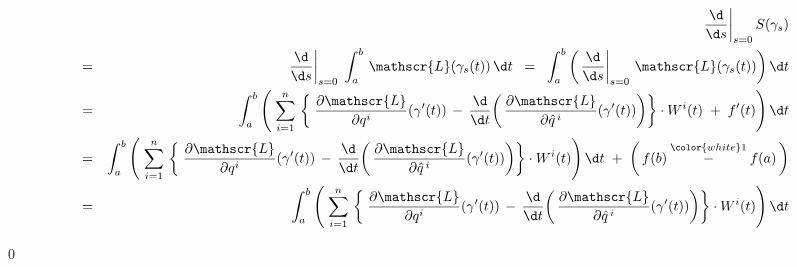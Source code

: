 \vskip 0.5cm
\begin{eqnarray*}
&&
	\left.\dfrac{\d}{\d s}\right\vert_{s=0} S\!\left(\gamma_{s}\right)
\\
& = &
	\left.\dfrac{\d}{\d s}\right\vert_{s=0}\; \int_{a}^{b}\,\mathscr{L}\!\left(\gamma_{s}(t)\right)\d t
\;\; = \;\;
	\int_{a}^{b}\left(\left.\dfrac{\d}{\d s}\right\vert_{s=0}\,\mathscr{L}\!\left(\gamma_{s}(t)\right)\right)\d t
\\
& = &
	\int_{a}^{b}\left(\;
		\overset{n}{\underset{i=1}{\sum}}\,\left\{\;
			\dfrac{\partial\mathscr{L}}{\partial q^{i}}\!\left(\gamma^{\prime}(t)\right)
			\, - \,
			\dfrac{\d}{\d t}\!\left(\,
				\dfrac{\partial\mathscr{L}}{\partial\hat{q}^{\,i}}\!\left(\gamma^{\prime}(t)\right)
				\right)
			\right\}
		\cdot
		W^{i}(t)
		\; + \;
		f^{\prime}(t)
		\right)\d t
\\
& = &
	\int_{a}^{b}\left(\;
		\overset{n}{\underset{i=1}{\sum}}\,\left\{\;
			\dfrac{\partial\mathscr{L}}{\partial q^{i}}\!\left(\gamma^{\prime}(t)\right)
			\, - \,
			\dfrac{\d}{\d t}\!\left(\,
				\dfrac{\partial\mathscr{L}}{\partial\hat{q}^{\,i}}\!\left(\gamma^{\prime}(t)\right)
				\right)
			\right\}
		\cdot
		W^{i}(t)
		\right)\d t
	\; + \;
	\left(\, f(b) \overset{{\color{white}1}}{-} f(a) \,\right)
\\
& = &
	\int_{a}^{b}\left(\;
		\overset{n}{\underset{i=1}{\sum}}\,\left\{\;
			\dfrac{\partial\mathscr{L}}{\partial q^{i}}\!\left(\gamma^{\prime}(t)\right)
			\, - \,
			\dfrac{\d}{\d t}\!\left(\,
				\dfrac{\partial\mathscr{L}}{\partial\hat{q}^{\,i}}\!\left(\gamma^{\prime}(t)\right)
				\right)
			\right\}
		\cdot
		W^{i}(t)
		\right)\d t
\end{eqnarray*}

\qed




